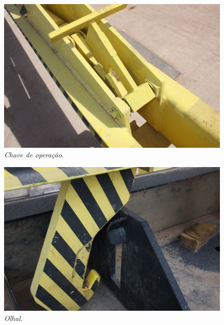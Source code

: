 \begin{figure}[H]
    \centering
    \includegraphics[width=0.9\columnwidth]{figs/nomenclatura/5.jpg}
    \caption{\emph{Chave de operação}.}
    \label{nomenclatura_5}
\end{figure}

\begin{figure}[H]
    \centering
    \includegraphics[width=0.9\columnwidth]{figs/nomenclatura/nomenclatura_6.jpg}
    \caption{\emph{Olhal}.}
    \label{nomenclatura_6}
\end{figure}


